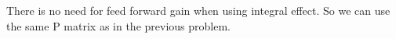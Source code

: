 There is no need for feed forward gain when using integral effect. So we can use the same P matrix as in the previous problem.\cite{Chen2014}
